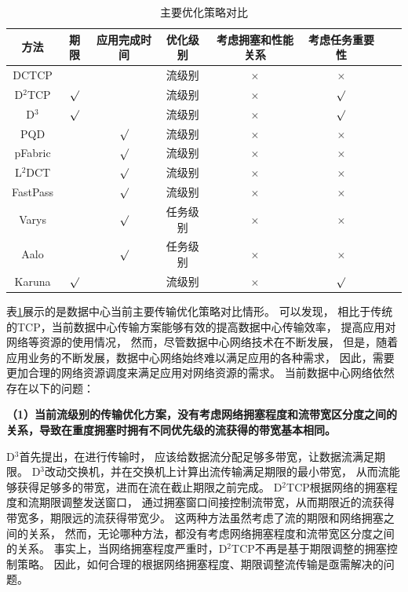 \begin{table}[h]
\centering
\caption{主要优化策略对比}\label{algorithm-compare}
\renewcommand{\arraystretch}{1.5}
\begin{tabular}{|c|c|c|c|c|c|c|c|} \hline
\setlength{\tabcolsep}{10pt}
方法&期限&应用完成时间&优化级别&考虑拥塞和性能关系&考虑任务重要性\\ \hline
DCTCP\cite{DCTCP}&&&流级别&$\times$&$\times$\\ \hline
D$^2$TCP\cite{D2TCP}&$\surd$&&流级别&$\times$&$\surd$\\ \hline
D$^3$\cite{D3}&$\surd$&&流级别&$\times$&$\surd$\\ \hline
PQD\cite{PDQ}&&$\surd$&流级别&$\times$&$\times$\\ \hline
pFabric\cite{pFabric}&&$\surd$&流级别&$\times$&$\times$\\ \hline
L$^2$DCT\cite{L2DCT}&&$\surd$&流级别&$\times$&$\times$\\ \hline
FastPass\cite{perry2015fastpass}&&$\surd$&流级别&$\times$&$\times$\\ \hline
Varys\cite{chowdhury2014efficient}&&$\surd$&任务级别&$\times$&$\times$\\ \hline
Aalo\cite{chowdhury2015efficient}&&$\surd$&任务级别&$\times$&$\times$\\ \hline
Karuna\cite{chen2016scheduling} &$\surd$&&流级别&$\times$&$\surd$\\ \hline
\end{tabular}
\end{table}


表\ref{algorithm-compare}展示的是数据中心当前主要传输优化策略对比情形。
可以发现，
相比于传统的TCP，当前数据中心传输方案能够有效的提高数据中心传输效率，
提高应用对网络等资源的使用情况，
然而，尽管数据中心网络技术在不断发展，
但是，随着应用业务的不断发展，数据中心网络始终难以满足应用的各种需求，
因此，需要更加合理的网络资源调度来满足应用对网络资源的需求。
当前数据中心网络依然存在以下的问题：

\textbf{（1）当前流级别的传输优化方案，没有考虑网络拥塞程度和流带宽区分度之间的关系，导致在重度拥塞时拥有不同优先级的流获得的带宽基本相同。}

D$^3$首先提出，在进行传输时，
应该给数据流分配足够多带宽，让数据流满足期限。
D$^3$改动交换机，并在交换机上计算出流传输满足期限的最小带宽，
从而流能够获得足够多的带宽，进而在流在截止期限之前完成。
D$^2$TCP根据网络的拥塞程度和流期限调整发送窗口，
通过拥塞窗口间接控制流带宽，从而期限近的流获得带宽多，期限远的流获得带宽少。
这两种方法虽然考虑了流的期限和网络拥塞之间的关系，
然而，无论哪种方法，都没有考虑网络拥塞程度和流带宽区分度之间的关系。
事实上，当网络拥塞程度严重时，D$^2$TCP不再是基于期限调整的拥塞控制策略。
因此，如何合理的根据网络拥塞程度、期限调整流传输是亟需解决的问题。


